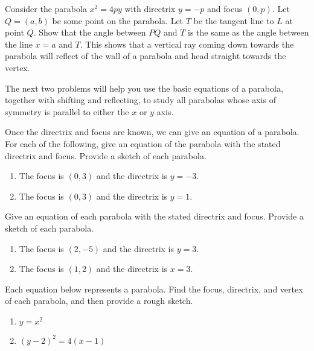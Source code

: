 \begin{problem*}[Optional]
Consider the parabola $x^2=4py$ with directrix $y=-p$ and focus $(0,p)$. Let $Q=(a,b)$ be some point on the parabola. Let $T$ be the tangent line to $L$ at point $Q$. Show that the angle between $PQ$ and $T$ is the same as the angle between the line $x=a$ and $T$. This shows that a vertical ray coming down towards the parabola will reflect of the wall of a parabola and head straight towards the vertex.    
\end{problem*}

The next two problems will help you use the basic equations of a parabola, together with shifting and reflecting, to study all parabolas whose axis of symmetry is parallel to either the $x$ or $y$ axis. 

\begin{problem} 
%
Once the directrix and focus are known, we can give an equation of a parabola. For each of the following, give an equation of the parabola with the stated directrix and focus. Provide a sketch of each parabola.
\begin{enumerate}
\item The focus is $(0,3)$ and the directrix is $y=-3$.
\item The focus is $(0,3)$ and the directrix is $y=1$.
\end{enumerate}
\end{problem}

\begin{problem}
Give an equation of each parabola with the stated directrix and focus. Provide a sketch of each parabola.
\begin{enumerate}
\item The focus is $(2,-5)$ and the directrix is $y=3$.
\item The focus is $(1,2)$ and the directrix is $x=3$.
\end{enumerate}
\end{problem}

\begin{problem}  
%
Each equation below represents a parabola.  Find the focus, directrix, and vertex of each parabola, and then provide a rough sketch.
\begin{enumerate}
\item $y=x^2$
\item $(y-2)^2=4(x-1)$
\end{enumerate}
\end{problem}

